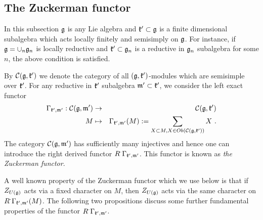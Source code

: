 \documentclass[12pt]{article}
\begin{document}
\subsection{The Zuckerman functor}  In this subsection $\frak g$ is any Lie algebra and $\frak k'\subset \frak g$ is a finite dimensional subalgebra which acts locally finitely and semisimply on $\frak g$. For instance, if $\frak g = \cup_n\frak g_n$ is locally reductive and $\frak k'\subset\frak g_n$ is a reductive in $\frak g_n$ subalgebra for some $n$, the above condition is satisfied.

By $\mathcal{C}(\frak g,\frak k')$ we denote the category of all $(\frak g,\frak k')$-modules which are semisimple over $\frak k'$.  For any reductive in $\frak k'$ subalgebra $\frak m'\subset\frak k'$, we consider the left exact functor
\begin{eqnarray*}
\Gamma_{\frak{k}',\frak{m}'} : \mathcal{C} (\frak g, \frak{m}')&\to& \mathcal{C}(\frak g, \frak{k}') \\
M&\mapsto& \Gamma_{\frak{k}',\frak{m}'} (M) := \sum\limits_{X\subset M, X\in Ob(\mathcal{C}(\frak g,\frak{k}'))} X\,\,.
\end{eqnarray*}
The category $\mathcal{C}(\frak g, \frak m')$ has sufficiently many injectives and hence one can introduce the right derived functor $R^\cdot \Gamma_{\frak k',\frak m'}$.  This functor is known as \emph{the Zuckerman functor}.

A well known property of the Zuckerman functor which we use below is that if $Z_{U(\frak g)}$ acts via a fixed character on $M$, then $Z_{U(\frak g)}$ acts via the same character on $R^\cdot\Gamma_{\frak k', \frak m'} (M)$. The following two propositions discuss some further fundamental properties of the functor $R^\cdot\Gamma_{\frak k',\frak m'}$.
\end{document}
